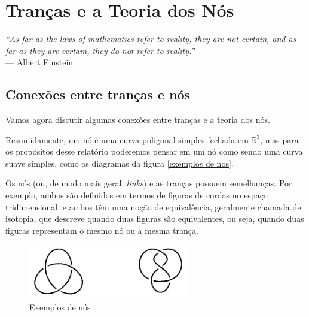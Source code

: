 \chapter[Tranças e a Teoria dos Nós]{Tranças e a Teoria dos Nós}
\label{cap-5}
\chaptermark{}
%
\hfill%
\begin{minipage}{10cm}
\begin{flushright}
\rightskip=0.5cm
\textit{``As far as the laws of mathematics refer to reality, they are not certain, and as far as they are certain, they do not refer to reality.''}
\\[0.1cm]
\rightskip=0.5cm
--- Albert Einstein
\end{flushright}
\end{minipage}

\section{Conexões entre tranças e nós}

    Vamos agora discutir algumas conexões entre tranças e a teoria dos nós.
	\par\vspace{0.3cm} Resumidamente, um nó é uma curva poligonal simples fechada em $\mathbb{R}^3$, mas para os propósitos desse relatório poderemos pensar em um nó como sendo uma curva suave simples, como os diagramas da figura \eqref{exemplos de nos}.
	
	\par\vspace{0.3cm} Os nós (ou, de modo mais geral, \textit{links}) e as tranças possuem semelhanças. Por exemplo, ambos são definidos em termos de figuras de cordas no espaço tridimensional, e ambos têm uma noção de equivalência, geralmente chamada de isotopia, que descreve quando duas figuras são equivalentes, ou seja, quando duas figuras representam o mesmo nó ou a mesma trança.  
	
	\begin{figure}[H]
		\begin{center}
			\includegraphics[width=7cm]{Images/exemplos_de_no.png}
		\end{center}\caption{Exemplos de nós}
		\label{exemplos de nos}
	\end{figure}
	
